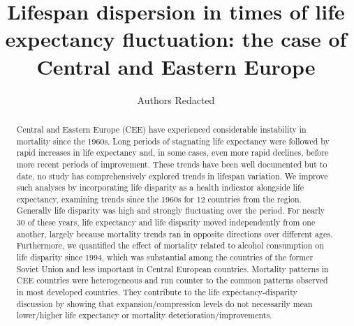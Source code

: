 \documentclass{article}
\title{Lifespan dispersion in times of life expectancy fluctuation: the case of Central and Eastern Europe}
\author[]{Authors Redacted}
\date{}
\begin{document}
\maketitle

\begin{abstract}
\textcolor[rgb]{1,0,0}{Central and Eastern Europe (CEE) have experienced considerable instability in mortality since the 1960s. Long periods of stagnating life expectancy were followed by rapid increases in life expectancy and, in some cases, even more rapid declines, before more recent periods of improvement. These trends have been well documented but to date, no study has comprehensively explored trends in lifespan variation.  We improve such analyses by incorporating life disparity as a health indicator alongside life expectancy, examining trends since the 1960s for 12 countries from the region. Generally life disparity was high and strongly fluctuating over the period. For nearly 30 of these years, life expectancy and life disparity moved independently from one another, largely because mortality trends ran in opposite directions over different ages. Furthermore, we quantified the effect of mortality related to alcohol consumption on life disparity since 1994, which was substantial among the countries of the former Soviet Union and less important in Central European countries. Mortality patterns in CEE countries were heterogeneous and run counter to the common patterns observed in most developed countries. They contribute to the life expectancy-disparity discussion by showing that expansion/compression levels do not necessarily mean lower/higher life expectancy or mortality deterioration/improvements.
}\end{abstract}


\newpage
\end{document}
